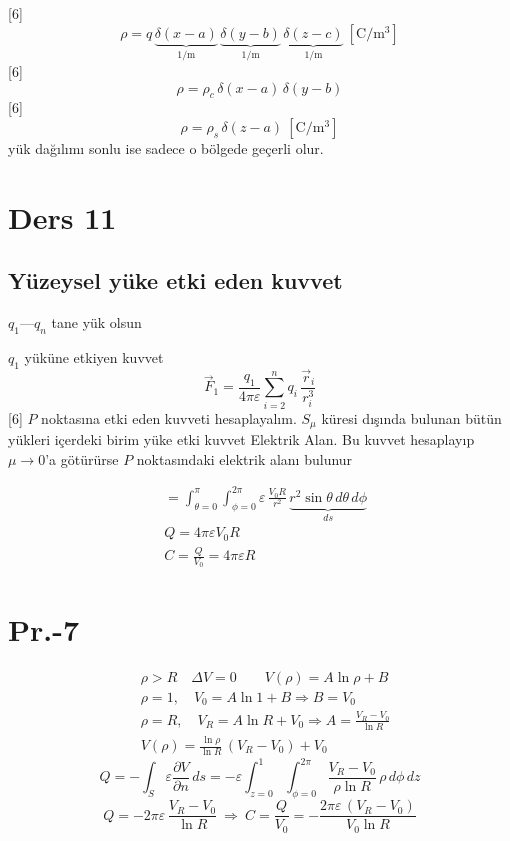 \documentclass[11pt,a4paper]{article}
\begin{document}
[6]
\[ \rho=q\,\underbrace{\delta(x-a)}_{1/\mathrm m}\,\underbrace{\delta(y-b)}_{1/\mathrm m}\,\underbrace{\delta(z-c)}_{1/\mathrm m}\ [\mathrm{C/m^3}] \]
[6]
\[ \rho=\rho_c\,\delta(x-a)\,\delta(y-b) \]
[6]
\[ \rho=\rho_s\,\delta(z-a)\ [\mathrm{C/m^3}] \]
yük dağılımı sonlu ise sadece o bölgede geçerli olur.

\section{Ders 11}
\subsection*{Yüzeysel yüke etki eden kuvvet}
$q_1$---$q_n$ tane yük olsun

$q_1$ yüküne etkiyen kuvvet
\[ \vec F_1=\frac{q_1}{4\pi\varepsilon}\sum_{i=2}^{n}q_i\,\frac{\vec r_i}{r_i^3} \]
[6]
$P$ noktasına etki eden kuvveti hesaplayalım. $S_\mu$ küresi dışında bulunan bütün yükleri içerdeki birim yüke etki kuvvet Elektrik Alan. Bu kuvvet hesaplayıp $\mu\to0$'a götürürse $P$ noktasındaki elektrik alanı bulunur

\begin{align*}
&=\int_{\theta=0}^{\pi}\int_{\phi=0}^{2\pi}\varepsilon\,\frac{V_0R}{r^2}\,\underbrace{r^2\sin\theta\,d\theta\,d\phi}_{ds}\\
&Q=4\pi\varepsilon V_0R\\
&C=\frac{Q}{V_0}=4\pi\varepsilon R
\end{align*}

\section{Pr.-7}
\begin{align*}
&\rho>R\quad \Delta V=0\qquad V(\rho)=A\ln\rho+B\\
&\rho=1,\quad V_0=A\ln1+B\Rightarrow B=V_0\\
&\rho=R,\quad V_R=A\ln R+V_0\Rightarrow A=\frac{V_R-V_0}{\ln R}\\
&V(\rho)=\frac{\ln\rho}{\ln R}\,(V_R-V_0)+V_0
\end{align*}
\[ Q=-\int_S\varepsilon\frac{\partial V}{\partial n}\,ds=-\varepsilon\int_{z=0}^{1}\int_{\phi=0}^{2\pi}\frac{V_R-V_0}{\rho\ln R}\,\rho\,d\phi\,dz \]
\[ Q=-2\pi\varepsilon\,\frac{V_R-V_0}{\ln R}\ \Rightarrow\ C=\frac{Q}{V_0}=-\frac{2\pi\varepsilon\,(V_R-V_0)}{V_0\ln R} \]
\end{document}
